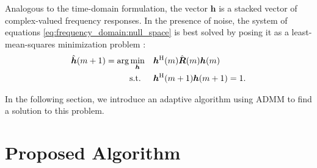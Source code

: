 \documentclass{article}
\newcommand{\hf}{{\bm{h}}}
\newcommand{\Rf}{{\bm{{R}}}}
\begin{document}
Analogous to the time-domain formulation, the vector \(\hf\) is a stacked vector of complex-valued frequency responses.
In the presence of noise, the system of equations \eqref{eq:frequency_domain:null_space} is best solved by posing it as a least-mean-squares minimization problem \cite{guanghanxuLeastsquaresApproachBlind1995,huangAdaptiveMultichannelLeast2002}:
\begin{align}
    \hat{\hf}(m+1) = \arg \min_{\hf} \quad &\hf^\herm(m) \hat{\Rf}(m) \hf(m) \label{eq:frequency_domain:min_prob}\\
    \text{s.t. } \quad &\hf^\herm(m+1) \hf(m+1) = 1.
\end{align}

In the following section, we introduce an adaptive algorithm using ADMM to find a solution to this problem.

\section{Proposed Algorithm}
\label{sec:proposed_method}

\end{document}
